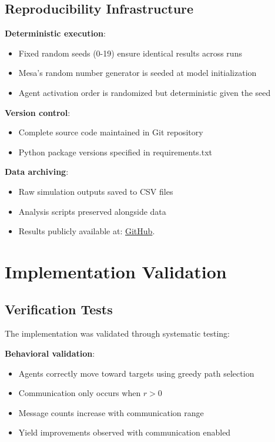 \vspace{1cm}

\subsection{Reproducibility Infrastructure}

\textbf{Deterministic execution}:
\begin{itemize}
    \item Fixed random seeds (0-19) ensure identical results across runs
    \item Mesa's random number generator is seeded at model initialization
    \item Agent activation order is randomized but deterministic given the seed
\end{itemize}

\textbf{Version control}:
\begin{itemize}
    \item Complete source code maintained in Git repository
    \item Python package versions specified in requirements.txt
\end{itemize}

\textbf{Data archiving}:
\begin{itemize}
    \item Raw simulation outputs saved to CSV files
    \item Analysis scripts preserved alongside data
    \item Results publicly available at: \href{https://github.com/marufdevops/multiagent-cooperation-research}{GitHub}.
\end{itemize}

\section{Implementation Validation}

\subsection{Verification Tests}

The implementation was validated through systematic testing:

\textbf{Behavioral validation}:
\begin{itemize}
    \item Agents correctly move toward targets using greedy path selection
    \item Communication only occurs when $r > 0$
    \item Message counts increase with communication range
    \item Yield improvements observed with communication enabled
\end{itemize}

